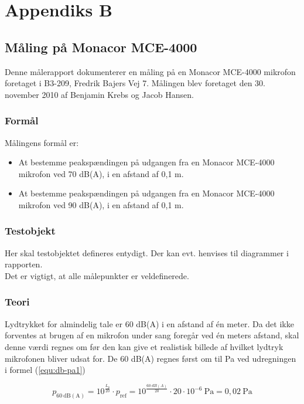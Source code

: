 \chapter{Appendiks B}
\label{mic_output}
\section*{Måling på Monacor MCE-4000}
Denne målerapport dokumenterer en måling på en Monacor MCE-4000 mikrofon foretaget i B3-209, Fredrik Bajers Vej 7. Målingen blev foretaget den 30. november 2010 af Benjamin Krebs og Jacob Hansen.
\subsection*{Formål}
\label{mic_output_formaal}
Målingens formål er:
\begin{itemize}
\item At bestemme peakspændingen på udgangen fra en Monacor MCE-4000 mikrofon ved 70 dB(A), i en afstand af 0,1 m.
\item At bestemme peakspændingen på udgangen fra en Monacor MCE-4000 mikrofon ved 90 dB(A), i en afstand af 0,1 m.
\end{itemize}
\subsection*{Testobjekt}
\label{mic_output_testobjekt}
Her skal testobjektet defineres entydigt. Der kan evt. henvises til diagrammer i rapporten.\\
Det er vigtigt, at alle målepunkter er veldefinerede.\\

\subsection*{Teori}
\label{mic_output_teori}
Lydtrykket for almindelig tale er 60 dB(A) i en afstand af én meter. Da det ikke forventes at brugen af en mikrofon under sang foregår ved én meters  afstand, skal denne værdi regnes om før den kan give et realistisk billede af hvilket lydtryk mikrofonen bliver udsat for. De 60 dB(A) regnes først om til Pa ved udregningen i formel (\ref{equ:db-pa1})

\begin{equation}
\label{equ:db-pa1}
p_{\mathrm{60~dB(A)}} = 10^{\frac{L_p}{20}} \cdot p_{\mathrm{ref}} = 10^{\frac{60~dB(A)}{20}} \cdot 20 \cdot 10^{-6}~\mathrm{Pa} = 0,02~\mathrm{Pa}
\end{equation}

